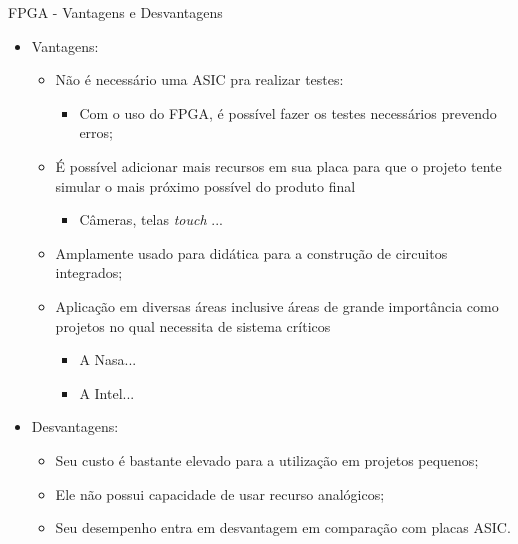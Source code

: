 	\begin{frame}{FPGA - Vantagens e Desvantagens}
		\begin{itemize}
			\item Vantagens:
			\begin{itemize}
				\setlength\itemsep{0.2em}
				\item Não é necessário uma ASIC pra realizar testes:
				\begin{itemize}
					\item Com o uso do FPGA, é possível fazer os testes necessários prevendo erros;
				\end{itemize}

				\item É possível adicionar mais recursos em sua placa para que o projeto tente simular o mais próximo possível do produto final
				\begin{itemize}
					\item Câmeras, telas \textit{touch} ...
				\end{itemize}

				\item Amplamente usado para didática para a construção de circuitos integrados;

				\item Aplicação em diversas áreas inclusive áreas de grande importância como projetos no qual necessita de sistema críticos
				\begin{itemize}
					\item A Nasa...
					\item A Intel...
				\end{itemize}
			\end{itemize}

			\bigskip

			\item Desvantagens:
			\begin{itemize}
				\setlength\itemsep{0.2em}
				\item Seu custo é bastante elevado para a utilização em projetos pequenos;

				\item Ele não possui capacidade de usar recurso analógicos;

				\item Seu desempenho entra em desvantagem em comparação com placas ASIC.
			\end{itemize}
		\end{itemize}
	\end{frame}
